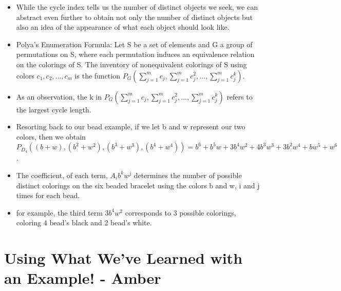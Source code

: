 \documentclass{beamer}
\begin{document}
\begin{frame}
\begin{itemize}

\item While the cycle index tells us the number of distinct objects we seek, we can abstract even further to obtain not only the number of distinct objects but also an idea of the appearance of what each object should look like.

\item Polya's Enumeration Formula: Let S be a set of elements and G a group of permutations on S, where each permutation induces an equivalence relation on the colorings of S. The inventory of nonequivalent colorings of S using colors $c_{1},c_{2},...,c_{m}$ is the function $P_{G}(\sum_{j=1}^{m}c_{j},\sum_{j=1}^{m}c_{j}^{2},...,\sum_{j=1}^{m}c_{j}^{k})$.

\item As an observation, the k in $P_{G}(\sum_{j=1}^{m}c_{j},\sum_{j=1}^{m}c_{j}^{2},...,\sum_{j=1}^{m}c_{j}^{k})$ refers to the largest cycle length.


\end{itemize}
\end{frame}


\begin{frame}
\begin{itemize}

\item Resorting back to our bead example, if we let b and w represent our two colors, then we obtain $P_{D_{4}}((b+w), (b^2+w^2), (b^3+w^3), (b^4+w^4)) = b^6 + b^5w + 3b^4w^2 + 4b^3w^3 + 3b^2w^4 + bw^5 + w^6$.

\item The coefficient, of each term, $A_{i}b^{k}w^{j}$ determines the number of possible distinct colorings on the six beaded bracelet using the colors b and w, i and j times for each bead.

\item for example, the third term $3b^4w^2$ corresponds to 3 possible colorings, coloring 4 bead's black and 2 bead's white.

\end{itemize}
\end{frame}
\section{Using What We've Learned with an Example! - Amber}
\end{document}
